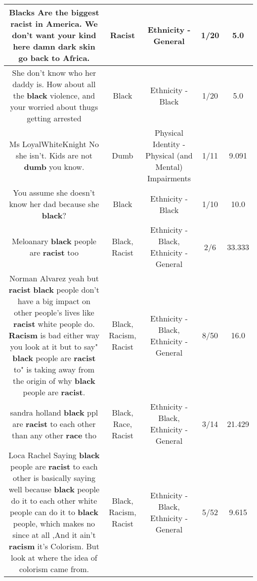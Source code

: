 \documentclass[11pt]{article}
\newlength\mylength
\begin{document}
\begin{center}
\begin{longtable}{|C{.65\mylength}|C{.30\mylength}|C{.12\mylength}|C{.12\mylength}|C{.12\mylength}|}
  \small Blacks Are the biggest \textbf{racist} in America. We don't want your kind here damn dark skin go back to Africa.\normalsize   & Racist & Ethnicity - General & 1/20 & 5.0 \\  \hline
  \small She don't know who her daddy is. How about all the \textbf{black} violence, and your worried about thugs getting arrested\normalsize   & Black & Ethnicity - Black & 1/20 & 5.0 \\  \hline
  \small Ms LoyalWhiteKnight No she isn't. Kids are not \textbf{dumb} you know.\normalsize   & Dumb & Physical Identity - Physical (and Mental) Impairments & 1/11 & 9.091 \\  \hline
  \small You assume she doesn't know her dad because she \textbf{black}?\normalsize   & Black & Ethnicity - Black & 1/10 & 10.0 \\  \hline
  \small Meloanary \textbf{black} people are \textbf{racist} too\normalsize   & Black, Racist & Ethnicity - Black, Ethnicity - General & 2/6 & 33.333 \\  \hline
  \small Norman Alvarez yeah but \textbf{racist} \textbf{black} people don't have a big impact on other people's lives like \textbf{racist} white people do. \textbf{Racism} is bad either way you look at it but to say" \textbf{black} people are \textbf{racist} to" is taking away from the origin of why \textbf{black} people are \textbf{racist}.\normalsize   & Black, Racism, Racist & Ethnicity - Black, Ethnicity - General & 8/50 & 16.0 \\  \hline
  \small sandra holland \textbf{black} ppl are \textbf{racist} to each other than any other \textbf{race} tho\normalsize   & Black, Race, Racist & Ethnicity - Black, Ethnicity - General & 3/14 & 21.429 \\  \hline
  \small Loca Rachel Saying \textbf{black} people are \textbf{racist} to each other is basically saying well because \textbf{black} people do it to each other white people can do it to \textbf{black} people, which makes no since at all ,And it ain't \textbf{racism} it's Colorism. But look at where the idea of colorism  came from.\normalsize   & Black, Racism, Racist & Ethnicity - Black, Ethnicity - General & 5/52 & 9.615 \\  \hline

\end{longtable}
\end{center}
\end{document}
